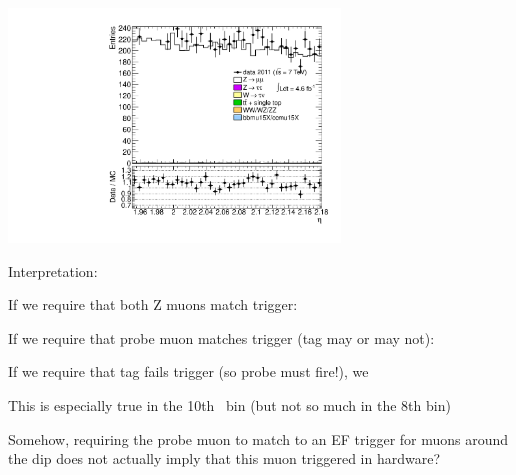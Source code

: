 {\includegraphics[width=0.66\textwidth]{dates/20130306/figures/both/Ztinv_10_A_stack_lP_eta_ALL.pdf} 
\cole
}
 {
Interpretation:
\iteb
\item If we require that both Z muons match trigger: 
\item If we require that probe muon matches trigger (tag may or may not): 
\item If we require that tag fails trigger (so probe must fire!), we 
\item This is especially true in the 10th \eta\ bin (but not so much in the 8th bin)
\iteb
\item Somehow, requiring the probe muon to match to an EF trigger for muons around the dip  does not actually imply that this muon triggered in hardware?
\itee
\itee
}

